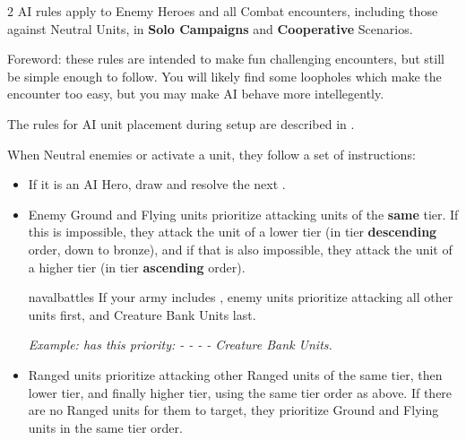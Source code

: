 
\begin{multicols*}{2}
  AI rules apply to Enemy Heroes and all Combat encounters, including those against Neutral Units, in \textbf{Solo Campaigns} and \textbf{Cooperative} Scenarios.

  \bigskip
  Foreword: these rules are intended to make fun challenging encounters, but still be simple enough to follow.
  You will likely find some loopholes which make the encounter too easy, but you may make AI behave more intellegently.

  The rules for AI unit placement during setup are described in .

  When Neutral enemies or  activate a unit, they follow a set of instructions:\par

  \begin{itemize}
    \item If it is an AI Hero, draw and resolve the next .

    \item Enemy Ground  and Flying  units prioritize attacking units of the \textbf{same} tier.
    If this is impossible, they attack the unit of a lower tier (in tier \textbf{descending} order, down to bronze), and if that is also impossible, they attack the unit of a higher tier (in tier \textbf{ascending} order).\par

    \begin{expansion}{navalbattles}
      If your army includes , enemy units prioritize attacking all other units first, and Creature Bank Units last.
    \end{expansion}

    \textit{Example:  has this priority:
    - 
    - 
    - 
    - Creature Bank Units.}

    \item Ranged  units prioritize attacking other Ranged  units of the same tier, then lower tier, and finally higher tier, using the same tier order as above.
    If there are no Ranged  units for them to target, they prioritize Ground  and Flying  units in the same tier order.\par


\end{itemize}
\end{multicols*}
